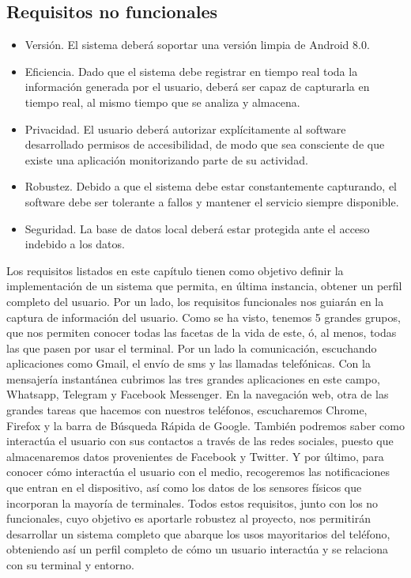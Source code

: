 \documentclass[12pt,a4paper,oneside]{book} %
\begin{document}
\subsection{Requisitos no funcionales}
\begin{itemize}
	\item Versión. El sistema deberá soportar una versión limpia de Android 8.0. 
	\item Eficiencia. Dado que el sistema debe registrar en tiempo real toda la información generada por el usuario, deberá ser capaz de capturarla en tiempo real, al mismo tiempo que se analiza y almacena. 
	\item Privacidad. El usuario deberá autorizar explícitamente al software desarrollado permisos de accesibilidad, de modo que sea consciente de que existe una aplicación monitorizando parte de su actividad.
	\item Robustez. Debido a que el sistema debe estar constantemente capturando, el software debe ser tolerante a fallos y mantener el servicio siempre disponible.  
	\item Seguridad. La base de datos local deberá estar protegida ante el acceso indebido a los datos. 
\end{itemize}
Los requisitos listados en este capítulo tienen como objetivo definir la implementación de un sistema que permita, en última instancia, obtener un perfil completo del usuario. 
\newline \newline 
Por un lado, los requisitos funcionales nos guiarán en la captura de información del usuario. Como se ha visto, tenemos 5 grandes grupos, que nos permiten conocer todas las facetas de la vida de este, ó, al menos, todas las que pasen por usar el terminal. 
\newline \newline
Por un lado la comunicación, escuchando aplicaciones como Gmail, el envío de sms y las llamadas telefónicas. Con la mensajería instantánea cubrimos las tres grandes aplicaciones en este campo, Whatsapp, Telegram y Facebook Messenger. En la navegación web, otra de las grandes tareas que hacemos con nuestros teléfonos, escucharemos Chrome, Firefox y la barra de Búsqueda Rápida de Google. 
\newline \newline 
También podremos saber como interactúa el usuario con sus contactos a través de las redes sociales, puesto que almacenaremos datos provenientes de Facebook y Twitter. Y por último, para conocer cómo interactúa el usuario con el medio, recogeremos las notificaciones que entran en el dispositivo, así como los datos de los sensores físicos que incorporan la mayoría de terminales. 
\newline \newline 
Todos estos requisitos, junto con los no funcionales, cuyo objetivo es aportarle robustez al proyecto, nos permitirán desarrollar un sistema completo que abarque los usos mayoritarios del teléfono, obteniendo así un perfil completo de cómo un usuario interactúa y se relaciona con su terminal y entorno. 
\break
\end{document}
